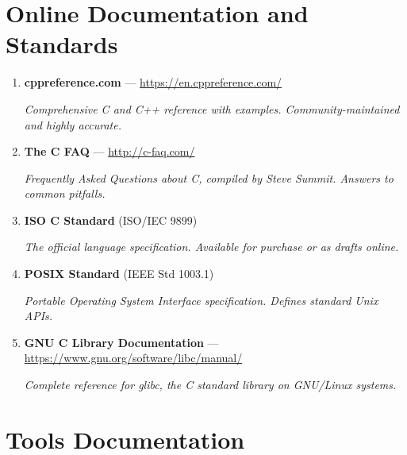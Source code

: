 \documentclass[11pt,openany]{book}
\begin{document}
\section*{Online Documentation and Standards}

\begin{enumerate}
    \item \textbf{cppreference.com} — \url{https://en.cppreference.com/}

    \textit{Comprehensive C and C++ reference with examples. Community-maintained and highly accurate.}

    \item \textbf{The C FAQ} — \url{http://c-faq.com/}

    \textit{Frequently Asked Questions about C, compiled by Steve Summit. Answers to common pitfalls.}

    \item \textbf{ISO C Standard} (ISO/IEC 9899)

    \textit{The official language specification. Available for purchase or as drafts online.}

    \item \textbf{POSIX Standard} (IEEE Std 1003.1)

    \textit{Portable Operating System Interface specification. Defines standard Unix APIs.}

    \item \textbf{GNU C Library Documentation} — \url{https://www.gnu.org/software/libc/manual/}

    \textit{Complete reference for glibc, the C standard library on GNU/Linux systems.}
\end{enumerate}

\section*{Tools Documentation}
\end{document}
